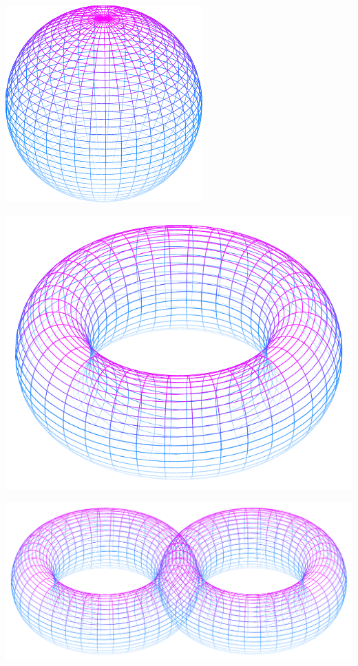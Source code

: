 \documentclass[11pt,openany]{article}
\begin{document}
\begin{center}
\begin{minipage}{.32\textwidth}\centering
\includegraphics[scale=.8]{../tikz/grad-math-tikz-pdf/sphere.pdf}
\end{minipage}\hfill
\begin{minipage}{.32\textwidth}\centering
\includegraphics[scale=.45]{../tikz/grad-math-tikz-pdf/torus.pdf}
\end{minipage}\hfill
\begin{minipage}{.32\textwidth}\centering
\includegraphics[scale=.3]{../tikz/grad-math-tikz-pdf/double-torus.pdf}
\end{minipage}
\end{center}
\end{document}
